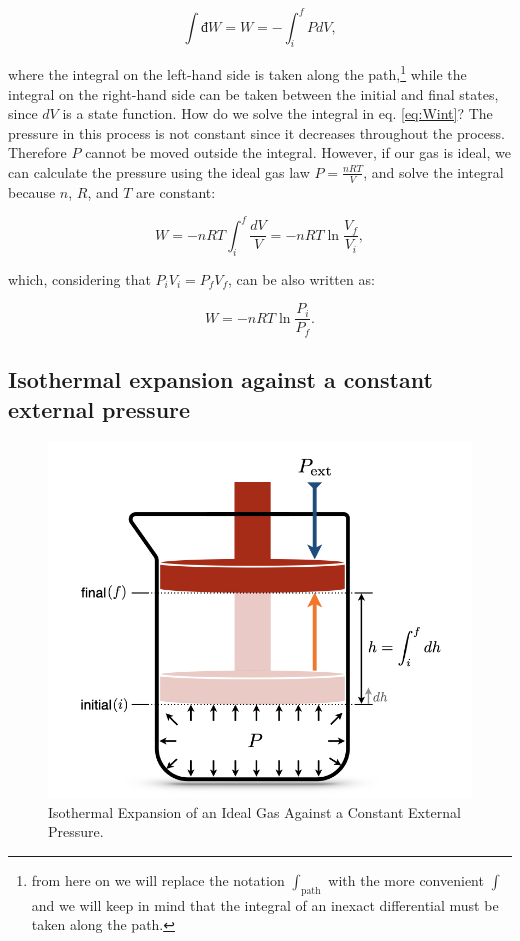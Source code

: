 \documentclass[
  9pt,
]{extbook}
\theoremstyle{definition}
\theoremstyle{definition}
\theoremstyle{definition}
\theoremstyle{remark}
\begin{document}
\begin{equation}
  \int đ W = W = - \int_{i}^{f} PdV,
  \label{eq:Wint}
\end{equation}

where the integral on the left-hand side is taken along the path,\footnote{from here on we will replace the notation \(\int_{\text{path}}\) with the more convenient \(\int\) and we will keep in mind that the integral of an inexact differential must be taken along the path.} while the integral on the right-hand side can be taken between the initial and final states, since \(dV\) is a state function.
How do we solve the integral in eq. \eqref{eq:Wint}? The pressure in this process is not constant since it decreases throughout the process. Therefore \(P\) cannot be moved outside the integral. However, if our gas is ideal, we can calculate the pressure using the ideal gas law \(P=\frac{nRT}{V}\), and solve the integral because \(n\), \(R\), and \(T\) are constant:

\begin{equation}
  W = - nRT \int_{i}^{f} \frac{dV}{V} = -nRT \ln \frac{V_f}{V_i},
  \label{eq:WintsolvedV}
\end{equation}

which, considering that \(P_iV_i=P_fV_f\), can be also written as:

\begin{equation}
  W = -nRT \ln \frac{P_i}{P_f}.
  \label{eq:WintsolvedP}
\end{equation}

\hypertarget{isothermal-expansion-against-a-constant-external-pressure}{%
\subsection{Isothermal expansion against a constant external pressure}\label{isothermal-expansion-against-a-constant-external-pressure}}

\begin{figure}

{\centering \includegraphics[width=0.5\linewidth]{./img/OEP_Figures.004} 

}

\caption{Isothermal Expansion of an Ideal Gas Against a Constant External Pressure.}\label{fig:Fig2c3}
\end{figure}
\end{document}
